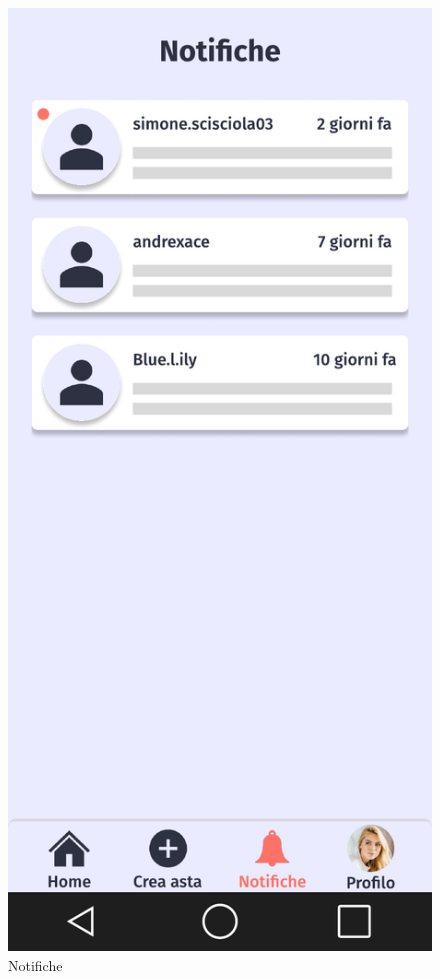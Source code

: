 \begin{figure}[!htb]
\begin{minipage}{0.32\textwidth}
                    \centering
                    \includegraphics[width=.7\linewidth]{Immagini/Frames/Compratore/C5.pdf}
                    \caption{Notifiche}
            \end{minipage}\hfill
        \end{figure}

